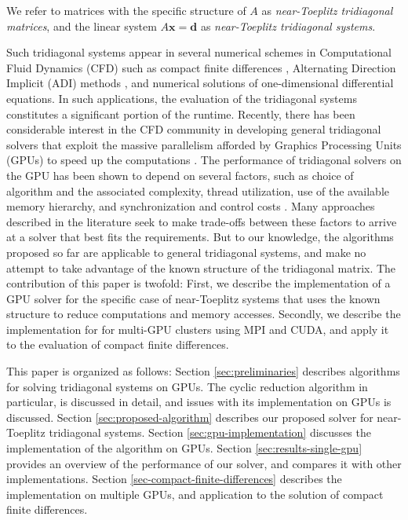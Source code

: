 \documentclass{elsarticle}
\begin{document}
We refer to matrices with the specific structure of $A$
as \emph{near-Toeplitz tridiagonal matrices},
and the linear system $A\bm{x}=\bm{d}$ as \emph{near-Toeplitz tridiagonal systems}.

Such tridiagonal systems
appear in several numerical schemes
in Computational Fluid Dynamics (CFD)
such as
compact finite differences \cite{lele1992compact},
Alternating Direction Implicit (ADI) methods \cite{1955ADI}, and
numerical solutions of one-dimensional differential equations.
In such applications,
the evaluation of the tridiagonal systems constitutes
a significant portion of the runtime.
Recently, there has been considerable interest in the CFD community
in developing general tridiagonal solvers that
exploit the massive parallelism afforded by
Graphics Processing Units (GPUs)
to speed up the computations
\cite{tutkun2012gpu}
\cite{esfahanian2014efficient}
\cite{GoSt11CR}.
The performance of tridiagonal solvers on the GPU
has been shown to depend on several factors,
such as
choice of algorithm and the associated complexity,
thread utilization,
use of the available memory hierarchy,
and synchronization and control costs
\cite{Zhang2010FTS}.
Many approaches described in the literature
seek to make trade-offs between these factors
to arrive at a solver that best fits the requirements.
But to our knowledge,
the algorithms proposed so far
are applicable to general tridiagonal systems,
and make no attempt to take advantage of
the known structure of the tridiagonal matrix.
The contribution of this paper is twofold:
First, we describe the implementation of a GPU solver
for the specific case of near-Toeplitz systems
that uses the known structure to reduce
computations and memory accesses.
Secondly, we describe the implementation for
for multi-GPU clusters using MPI and CUDA,
and apply it to the evaluation of compact finite differences.

This paper is organized as follows:
Section \ref{sec:preliminaries}
describes algorithms for solving tridiagonal systems on GPUs.
The cyclic reduction algorithm in particular, is discussed in detail,
and issues with its implementation on GPUs is discussed.
Section \ref{sec:proposed-algorithm}
describes our proposed solver for near-Toeplitz tridiagonal systems.
Section \ref{sec:gpu-implementation}
discusses the implementation of the algorithm on GPUs.
Section \ref{sec:results-single-gpu}
provides an overview of the performance of our solver,
and compares it with other implementations.
Section \ref{sec-compact-finite-differences}
describes the implementation on multiple GPUs,
and application to the solution of compact finite differences.
\end{document}
